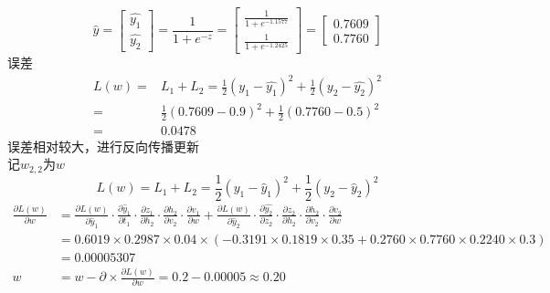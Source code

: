 \documentclass{homework}
\begin{document}
$$
\hat{y} = 
\begin{bmatrix}
	\hat{y_1}\\ \hat{{y_2}}
\end{bmatrix}
= \frac{1}{1 + e^{-z}}
= 
\begin{bmatrix}
	\frac{1}{1 + e^{-1.1577}} \\
	\frac{1}{1 + e^{-1.2425}}
\end{bmatrix}
=
\begin{bmatrix}
	0.7609\\ 0.7760
\end{bmatrix}
$$
误差
\begin{align*}
	L(w) = &L_1 + L_2 = \frac{1}{2}(y_1 - \hat{y_1})^2 + \frac{1}{2}(y_2-\hat{y_2})^2\\
	= &\frac{1}{2}(0.7609-0.9)^2 +\frac{1}{2}(0.7760 -0.5)^2\\
	=& 0.0478
\end{align*}
误差相对较大，进行反向传播更新\\
记$w_{2,2}$为$w$\\ 
$$
L(w) = L_1+L_2 = \frac{1}{2} (y_1 - \hat{y} _1)^2 + \frac{1}{2}(y_2 - \hat{y}_2)^2
$$
\begin{align*}
	\frac{\partial L(w)}{\partial w} &= \frac{\partial L(w)}{\partial \hat{y}_1}\cdot \frac{\partial \hat{y}_1}{\partial t_1}\cdot 
	\frac{\partial z_1}{\partial h_2} \cdot 
	\frac{\partial h_2}{\partial v_2}\cdot 
	\frac{\partial v_1}{\partial w}
	+ 
	\frac{\partial L(w)}{\partial \hat{y}_2}\cdot 
	\frac{\partial \hat{y_2}}{\partial z_2}\cdot 
	\frac{\partial z_2}{\partial h_2}\cdot 
	\frac{\partial h_2}{\partial v_2}\cdot 
	\frac{\partial v_2}{\partial w}\\ 
	&=0.6019\times 0.2987\times 0.04\times (-0.3191\times 0.1819\times 0.35 + 0.2760 \times 0.7760 \times 0.2240\times 0.3)\\ 
	& = 0.00005307\\ 
	w & = w - \partial \times \frac{\partial L(w)}{\partial w} = 0.2 - 0.00005 \approx 0.20  
\end{align*}
\end{document}
